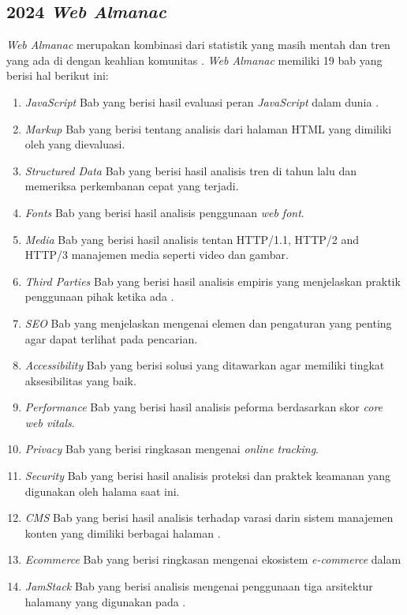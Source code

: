 \subsection{2024 \textit{Web Almanac}}
\label{subsec:almanac}

\textit{Web Almanac} merupakan kombinasi dari statistik yang masih mentah dan tren yang ada di \http dengan keahlian komunitas \web. \textit{Web Almanac} memiliki 19 bab yang berisi hal berikut ini:
\begin{enumerate}
    \item \textit{JavaScript} Bab yang berisi hasil evaluasi peran \textit{JavaScript} dalam dunia \web. 
    \item \textit{Markup} Bab yang berisi tentang analisis dari halaman HTML yang dimiliki oleh \web yang dievaluasi.
    \item \textit{Structured Data} Bab yang berisi hasil analisis tren di tahun lalu dan memeriksa perkembanan cepat yang terjadi.
    \item \textit{Fonts} Bab yang berisi hasil analisis penggunaan \textit{web font}.
    \item \textit{Media} Bab yang berisi hasil analisis tentan HTTP/1.1, HTTP/2 and HTTP/3 manajemen media seperti video dan gambar.
    \item \textit{Third Parties} Bab yang berisi hasil analisis empiris yang menjelaskan praktik penggunaan pihak ketika ada \web.
    \item \textit{SEO} Bab yang menjelaskan mengenai elemen dan pengaturan yang penting agar \web dapat terlihat pada pencarian.
    \item \textit{Accessibility} Bab yang berisi solusi yang ditawarkan agar memiliki tingkat aksesibilitas yang baik.
    \item \textit{Performance} Bab yang berisi hasil analisis peforma berdasarkan skor \textit{core web vitals}.
    \item \textit{Privacy} Bab yang berisi ringkasan mengenai \textit{online tracking}. 
    \item \textit{Security} Bab yang berisi hasil analisis proteksi dan praktek keamanan yang digunakan oleh halama \web saat ini.
    \item \textit{CMS} Bab yang berisi hasil analisis terhadap varasi darin sistem manajemen konten yang dimiliki berbagai halaman \web.
    \item \textit{Ecommerce} Bab yang berisi ringkasan mengenai ekosistem \textit{e-commerce} dalam \web 
    \item \textit{JamStack} Bab yang berisi analisis mengenai penggunaan tiga arsitektur halamany yang digunakan pada \web.

\end{enumerate}

